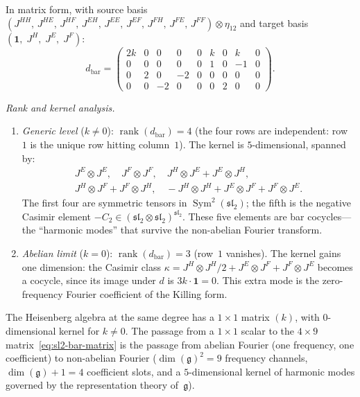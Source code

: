 \begin{example}
In matrix form, with source basis
$(J^{HH},\, J^{HE},\, J^{HF},\, J^{EH},\, J^{EE},\, J^{EF},\,
J^{FH},\, J^{FE},\, J^{FF}) \otimes \eta_{12}$
and target basis
$(\mathbf{1},\; J^H,\; J^E,\; J^F)$:
\begin{equation}\label{eq:sl2-bar-matrix-fourier}
d_{\mathrm{bar}}
= \begin{pmatrix}
2k & 0 & 0 & 0 & 0 & k & 0 & k & 0 \\
0 & 0 & 0 & 0 & 0 & 1 & 0 & -1 & 0 \\
0 & 2 & 0 & -2 & 0 & 0 & 0 & 0 & 0 \\
0 & 0 & -2 & 0 & 0 & 0 & 2 & 0 & 0
\end{pmatrix}.
\end{equation}

\emph{Rank and kernel analysis.}
\begin{enumerate}[label=\textup{(\roman*)}]
\item \emph{Generic level} ($k \neq 0$):
  $\operatorname{rank}(d_{\mathrm{bar}}) = 4$
  (the four rows are independent: row~$1$ is the unique row
  hitting column~$1$).  The kernel is
  $5$-dimensional, spanned by:
  \begin{gather*}
  J^E \otimes J^E, \quad
  J^F \otimes J^F, \quad
  J^H \otimes J^E + J^E \otimes J^H, \\
  J^H \otimes J^F + J^F \otimes J^H, \quad
  -J^H \otimes J^H + J^E \otimes J^F + J^F \otimes J^E.
  \end{gather*}
  The first four are symmetric tensors in $\operatorname{Sym}^2(\mathfrak{sl}_2)$; the
  fifth is the negative Casimir element $-C_2 \in
  (\mathfrak{sl}_2 \otimes \mathfrak{sl}_2)^{\mathfrak{sl}_2}$.
  These five elements are bar cocycles---the ``harmonic modes''
  that survive the non-abelian Fourier transform.

\item \emph{Abelian limit} ($k = 0$):
  $\operatorname{rank}(d_{\mathrm{bar}}) = 3$ (row~$1$ vanishes).
  The kernel gains one dimension: the Casimir class
  $\kappa = J^H \otimes J^H / 2 + J^E \otimes J^F + J^F \otimes J^E$
  becomes a cocycle, since its image under $d$ is
  $3k \cdot \mathbf{1} = 0$.  This extra mode is the
  zero-frequency Fourier coefficient of the Killing form.
\end{enumerate}
The Heisenberg algebra at the same degree has a $1 \times 1$ matrix
$(k)$, with $0$-dimensional kernel for $k \neq 0$.  The passage from
a $1 \times 1$ scalar to the $4 \times 9$
matrix~\eqref{eq:sl2-bar-matrix} is the passage from abelian Fourier
(one frequency, one coefficient) to non-abelian Fourier ($\dim(\mathfrak{g})^2 = 9$ frequency channels, $\dim(\mathfrak{g}) + 1 = 4$
coefficient slots, and a $5$-dimensional kernel of harmonic modes
governed by the representation theory of~$\mathfrak{g}$).
\end{example}

